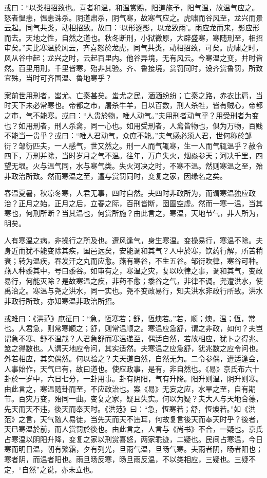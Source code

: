 \documentclass[]{article}
\begin{document}
或曰：``以类相招致也。喜者和温，和温赏赐，阳道施予，阳气温，故温气应之。怒者愠恚，愠恚诛杀。阴道肃杀，阴气寒，故寒气应之。虎啸而谷风至，龙兴而景云起。同气共类，动相招致。故曰：`以形逐影，以龙致雨'。雨应龙而来，影应形而去。天地之性，自然之道也。秋冬断刑，小狱微原，大辟盛寒，寒随刑至，相招审矣。''夫比寒温於风云，齐喜怒於龙虎，同气共类，动相招致，可矣。虎啸之时，风从谷中起；龙兴之时，云起百里内。他谷异境，无有风云。今寒温之变，并时皆然。百里用刑，千里皆寒，殆非其验。齐、鲁接境，赏罚同时，设齐赏鲁罚，所致宜殊，当时可齐国温、鲁地寒乎？

案前世用刑者，蚩尤、亡秦甚矣。蚩尤之民，湎湎纷纷；亡秦之路，赤衣比肩，当时天下未必常寒也。帝都之市，屠杀牛羊，日以百数，刑人杀牲，皆有贼心，帝都之市，气不能寒。或曰：``人贵於物，唯人动气。''夫用刑者动气乎？用受刑者为变也？如用刑者，刑人杀禽，同一心也。如用受刑者，人禽皆物也，俱为万物，百贱不能当一贵乎？或曰：``唯人君动气，众庶不能。''夫气感必须人君，世何称於邹衍？邹衍匹夫，一人感气，世又然之。刑一人而气辄寒，生一人而气辄温乎？赦令四下，万刑并除，当时岁月之气不温。往年，万户失火，烟焱参天；河决千里，四望无垠。火与温气同，水与寒气类。失火河决之时，不寒不温。然则寒温之至，殆非政治所致。然而寒温之至，遭与赏罚同时，变复之家，因缘名之矣。

春温夏暑，秋凉冬寒，人君无事，四时自然。夫四时非政所为，而谓寒温独应政治？正月之始，正月之后，立春之际，百刑皆断，囹圄空虚。然而一寒一温，当其寒也，何刑所断？当其温也，何赏所施？由此言之，寒温，天地节气，非人所为，明矣。

人有寒温之病，非操行之所及也。遭风逢气，身生寒温。变操易行，寒温不除。夫身近而犹不能变除其疾，国邑远矣，安能调和其气？人中於寒，饮药行解，所苦稍衰；转为温疾，吞发汗之丸而应愈。燕有寒谷，不生五谷。邹衍吹律，寒谷可种。燕人种黍其中，号曰黍谷。如审有之，寒温之灾，复以吹律之事，调和其气，变政易行，何能灭除？是故寒温之疾，非药不愈；黍谷之气，非律不调。尧遭洪水，使禹治之。寒温与尧之洪水，同一实也。尧不变政易行，知夫洪水非政行所致。洪水非政行所致，亦知寒温非政治所招。

或难曰：《洪范》庶征曰：``急，恆寒若；舒，恆燠若。''若，顺；燠，温；恆，常也。人君急，则常寒顺之；舒，则常温顺之。寒温应急舒，谓之非政，如何？夫岂谓急不寒、舒不温哉？人君急舒而寒温递至，偶适自然，若故相应，犹卜之得兆、筮之得数也。人谓天地应令问，其实适然。夫寒温之应急舒，犹兆数之应令问也。外若相应，其实偶然。何以验之？夫天道自然，自然无为。二令参偶，遭适逢会，人事始作，天气已有，故曰道也。使应政事，是有，非自然也。《易》京氏布六十卦於一岁中，六日七分，一卦用事。卦有阴阳，气有升降。阳升则温，阴升则寒。由此言之，寒温随卦而至，不应政治也。案《易》无妄之应，水旱之至，自有期节。百灾万变，殆同一曲。变复之家，疑且失实。何以为疑？夫大人与天地合德，先天而天不违，後天而奉天时。《洪范》曰：``急，恆寒若；舒，恆燠若。''如《洪范》之言，天气随人易徒，当先天而天不违耳，何故复言後天而奉天时乎？後者，天已寒温於前，而人赏罚於後也。由此言之，人言与《尚书》不合，一疑也。京氏占寒温以阴阳升降，变复之家以刑赏喜怒，两家乖迹，二疑也。民间占寒温，今日寒而明日温，朝有繁霜，夕有列光，旦雨气温，旦旸气寒。夫雨者阴，旸者阳也；寒者阴，而温者阳也。雨旦旸反寒，旸旦雨反温，不以类相应，三疑也。三疑不定，``自然''之说，亦未立也。
\end{document}
